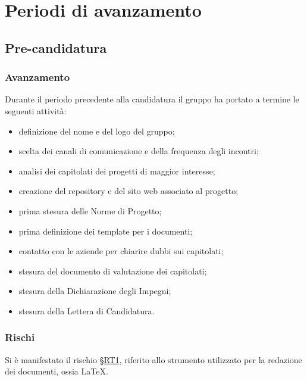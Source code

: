 \documentclass[10pt, letterpaper]{article}
\newcommand{\rif}[1]{\hyperref[#1]{§#1}}
\begin{document}

\section{Periodi di avanzamento}
\subsection{Pre-candidatura}
\subsubsection{Avanzamento}
Durante il periodo precedente alla candidatura il gruppo ha portato a termine le seguenti attività:
\begin{itemize}
    \item definizione del nome e del logo del gruppo;
    \item scelta dei canali di comunicazione e della frequenza degli incontri;
    \item analisi dei capitolati dei progetti di maggior interesse;
    \item creazione del repository e del sito web associato al progetto;
    \item prima stesura delle Norme di Progetto;
    \item prima definizione dei template per i documenti;
    \item contatto con le aziende per chiarire dubbi sui capitolati;
    \item stesura del documento di valutazione dei capitolati;
    \item stesura della Dichiarazione degli Impegni;
    \item stesura della Lettera di Candidatura.
\end{itemize}

\subsubsection{Rischi}
Si è manifestato il rischio \rif{RT1}, riferito allo strumento utilizzato per la redazione
dei documenti, ossia \LaTeX.
\end{document}
